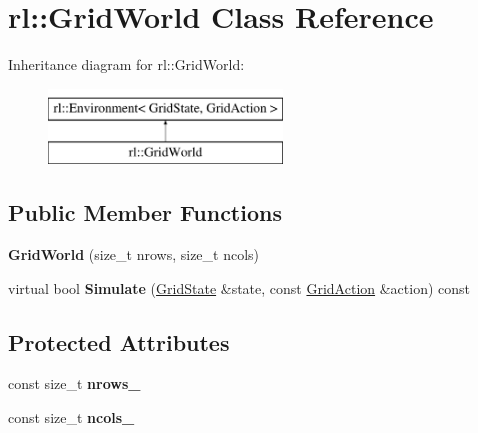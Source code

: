 \hypertarget{classrl_1_1_grid_world}{}\section{rl\+:\+:Grid\+World Class Reference}
\label{classrl_1_1_grid_world}
Inheritance diagram for rl\+:\+:Grid\+World\+:\begin{figure}[H]
\begin{center}
\leavevmode
\includegraphics[height=2.000000cm]{classrl_1_1_grid_world}
\end{center}
\end{figure}
\subsection*{Public Member Functions}
\begin{DoxyCompactItemize}
\item 
\hypertarget{classrl_1_1_grid_world_aa42ce8a5c29a05da15a0326a35f76c4a}{}\label{classrl_1_1_grid_world_aa42ce8a5c29a05da15a0326a35f76c4a} 
{\bfseries Grid\+World} (size\+\_\+t nrows, size\+\_\+t ncols)
\item 
\hypertarget{classrl_1_1_grid_world_ace712ef8fce35ad553a8e0316e4ec917}{}\label{classrl_1_1_grid_world_ace712ef8fce35ad553a8e0316e4ec917} 
virtual bool {\bfseries Simulate} (\hyperlink{structrl_1_1_grid_state}{Grid\+State} \&state, const \hyperlink{structrl_1_1_grid_action}{Grid\+Action} \&action) const
\end{DoxyCompactItemize}
\subsection*{Protected Attributes}
\begin{DoxyCompactItemize}
\item 
\hypertarget{classrl_1_1_grid_world_a1f4ab8ba45c7147e73f31f1defa26805}{}\label{classrl_1_1_grid_world_a1f4ab8ba45c7147e73f31f1defa26805} 
const size\+\_\+t {\bfseries nrows\+\_\+}
\item 
\hypertarget{classrl_1_1_grid_world_a42a1de550277a88ed5f2ed5ca2440c22}{}\label{classrl_1_1_grid_world_a42a1de550277a88ed5f2ed5ca2440c22} 
const size\+\_\+t {\bfseries ncols\+\_\+}
\end{DoxyCompactItemize}


